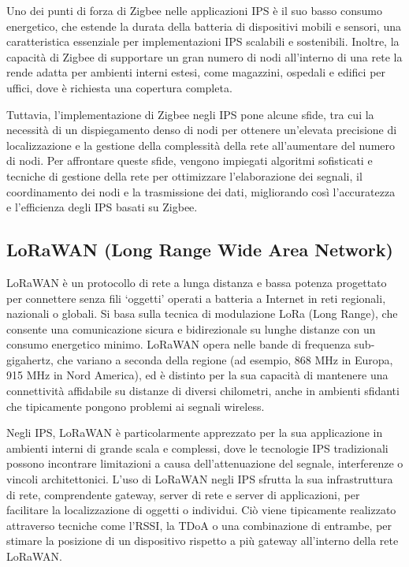 Uno dei punti di forza di Zigbee nelle applicazioni IPS è il suo basso consumo energetico, che estende la durata della batteria di dispositivi mobili e sensori, una caratteristica essenziale per implementazioni IPS scalabili e sostenibili. Inoltre, la capacità di Zigbee di supportare un gran numero di nodi all'interno di una rete la rende adatta per ambienti interni estesi, come magazzini, ospedali e edifici per uffici, dove è richiesta una copertura completa.

Tuttavia, l'implementazione di Zigbee negli IPS pone alcune sfide, tra cui la necessità di un dispiegamento denso di nodi per ottenere un'elevata precisione di localizzazione e la gestione della complessità della rete all'aumentare del numero di nodi. Per affrontare queste sfide, vengono impiegati algoritmi sofisticati e tecniche di gestione della rete per ottimizzare l'elaborazione dei segnali, il coordinamento dei nodi e la trasmissione dei dati, migliorando così l'accuratezza e l'efficienza degli IPS basati su Zigbee.

\subsection{LoRaWAN (Long Range Wide Area Network)}
\hspace{\parindent}LoRaWAN è un protocollo di rete a lunga distanza e bassa potenza progettato per connettere senza fili `oggetti' operati a batteria a Internet in reti regionali, nazionali o globali. Si basa sulla tecnica di modulazione LoRa (Long Range), che consente una comunicazione sicura e bidirezionale su lunghe distanze con un consumo energetico minimo. LoRaWAN opera nelle bande di frequenza sub-gigahertz, che variano a seconda della regione (ad esempio, 868 MHz in Europa, 915 MHz in Nord America), ed è distinto per la sua capacità di mantenere una connettività affidabile su distanze di diversi chilometri, anche in ambienti sfidanti che tipicamente pongono problemi ai segnali wireless.

Negli IPS, LoRaWAN è particolarmente apprezzato per la sua applicazione in ambienti interni di grande scala e complessi, dove le tecnologie IPS tradizionali possono incontrare limitazioni a causa dell'attenuazione del segnale, interferenze o vincoli architettonici. L'uso di LoRaWAN negli IPS sfrutta la sua infrastruttura di rete, comprendente gateway, server di rete e server di applicazioni, per facilitare la localizzazione di oggetti o individui. Ciò viene tipicamente realizzato attraverso tecniche come l'RSSI, la TDoA o una combinazione di entrambe, per stimare la posizione di un dispositivo rispetto a più gateway all'interno della rete LoRaWAN.

